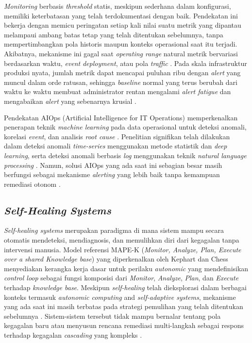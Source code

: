 \textit{Monitoring} berbasis \textit{threshold} statis, meskipun sederhana dalam konfigurasi, memiliki keterbatasan yang telah terdokumentasi dengan baik. Pendekatan ini bekerja dengan memicu peringatan setiap kali nilai suatu metrik yang dipantau melampaui ambang batas tetap yang telah ditentukan sebelumnya, tanpa mempertimbangkan pola historis maupun konteks operasional saat itu terjadi. Akibatnya, mekanisme ini gagal saat \textit{operating range} natural metrik bervariasi berdasarkan waktu, \textit{event} \textit{deployment}, atau pola \textit{traffic} \cite{voutsas2024mitigating}. Pada skala infrastruktur produksi nyata, jumlah metrik dapat mencapai puluhan ribu dengan \textit{alert} yang muncul dalam orde ratusan, sehingga \textit{baseline} normal yang terus berubah dari waktu ke waktu membuat administrator rentan mengalami \textit{alert fatigue} dan mengabaikan \textit{alert} yang sebenarnya krusial \cite{voutsas2024mitigating}.

Pendekatan AIOps (Artificial Intelligence for IT Operations) memperkenalkan penerapan teknik \textit{machine learning} pada data operasional untuk deteksi anomali, korelasi \textit{event}, dan analisis \textit{root cause} \cite{trinity2023}. Penelitian signifikan telah dilakukan dalam deteksi anomali \textit{time-series} menggunakan metode statistik dan \textit{deep learning}, serta deteksi anomali berbasis \textit{log} menggunakan teknik \textit{natural language processing} \cite{liu2025multivariate}. Namun, solusi AIOps yang ada saat ini sebagian besar masih berfungsi sebagai mekanisme \textit{alerting} yang lebih baik tanpa kemampuan remediasi otonom \cite{trinity2023}.

\subsection{\textit{Self-Healing} \textit{Systems}}

\textit{Self-healing systems} merupakan paradigma di mana sistem mampu secara otomatis mendeteksi, mendiagnosis, dan memulihkan diri dari kegagalan tanpa intervensi manusia. Model referensi MAPE-K (\textit{Monitor, Analyze, Plan, Execute over a shared Knowledge base}) yang diperkenalkan oleh Kephart dan Chess \cite{kephart2003vision} menyediakan kerangka kerja dasar untuk perilaku \textit{autonomic} yang mendefinisikan \textit{control loop} sebagai fungsi komposisi dari \textit{Monitor}, \textit{Analyze}, \textit{Plan}, dan \textit{Execute} terhadap \textit{knowledge base}. Meskipun \textit{self-healing} telah dieksplorasi dalam berbagai konteks termasuk \textit{autonomic computing} and \textit{self-adaptive systems}, mekanisme yang ada saat ini masih terbatas pada strategi pemulihan yang telah ditentukan sebelumnya \cite{liang2023self}. Sistem-sistem tersebut tidak mampu bernalar tentang pola kegagalan baru atau menyusun rencana remediasi multi-langkah sebagai respons terhadap kegagalan \textit{cascading} yang kompleks \cite{liang2023self}.

